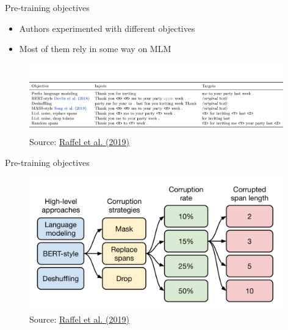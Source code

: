 
\begin{frame}{Pre-training objectives}

\vfill

	\begin{itemize}
		\item Authors experimented with different objectives
		\item Most of them rely in some way on MLM
	\end{itemize}
	
	\begin{figure}
		\centering
		\includegraphics[width = 11cm]{figure/t5-objectives1.png}\\ 
		\footnotesize{Source:} \href{https://arxiv.org/pdf/1910.10683.pdf}{\footnotesize Raffel et al. (2019)}
	\end{figure}
	
\vfill

\end{frame}


\begin{frame}{Pre-training objectives}

\vfill

	\begin{figure}
		\centering
		\includegraphics[width = 11cm]{figure/t5-objectives2.png}\\ 
		\footnotesize{Source:} \href{https://arxiv.org/pdf/1910.10683.pdf}{\footnotesize Raffel et al. (2019)}
	\end{figure}
	
\vfill

\end{frame}

